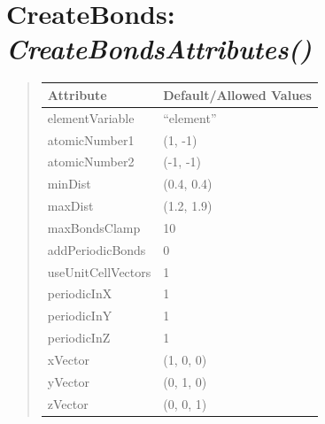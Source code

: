 \documentclass[letterpaper,10pt,english]{sphinxmanual}
\begin{document}
\section{\textbf{CreateBonds}: \emph{CreateBondsAttributes()}}
\label{attributes:createbonds-createbondsattributes}
\begin{DUlineblock}{0em}
\item[] 
\end{DUlineblock}
\begin{quote}

\begin{tabulary}{\linewidth}{|L|L|}
\hline

\textbf{Attribute}
 & 
\textbf{Default/Allowed Values}
\\
\hline
elementVariable
 & 
``element''
\\
\hline
atomicNumber1
 & 
(1, -1)
\\
\hline
atomicNumber2
 & 
(-1, -1)
\\
\hline
minDist
 & 
(0.4, 0.4)
\\
\hline
maxDist
 & 
(1.2, 1.9)
\\
\hline
maxBondsClamp
 & 
10
\\
\hline
addPeriodicBonds
 & 
0
\\
\hline
useUnitCellVectors
 & 
1
\\
\hline
periodicInX
 & 
1
\\
\hline
periodicInY
 & 
1
\\
\hline
periodicInZ
 & 
1
\\
\hline
xVector
 & 
(1, 0, 0)
\\
\hline
yVector
 & 
(0, 1, 0)
\\
\hline
zVector
 & 
(0, 0, 1)
\\
\hline\end{tabulary}

\end{quote}

\begin{DUlineblock}{0em}
\item[] 
\end{DUlineblock}

\begin{DUlineblock}{0em}
\item[] 
\end{DUlineblock}
\end{document}
